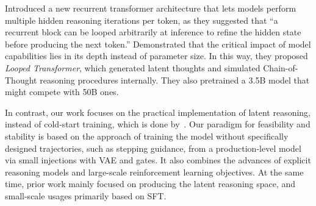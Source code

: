 \citet{geiping2025scalingtesttimecomputelatent} Introduced a new recurrent transformer architecture that lets models perform multiple hidden reasoning iterations per token, as they suggested that ``a recurrent block can be looped arbitrarily at inference to refine the hidden state before producing the next token.''
\citet{saunshi2025reasoninglatentthoughtspower} Demonstrated that the critical impact of model capabilities lies in its depth instead of parameter size.
In this way, they proposed \textit{Looped Transformer}, which generated latent thoughts and simulated Chain-of-Thought reasoning procedures internally.
They also pretrained a 3.5B model that might compete with 50B ones.

In contrast, our work focuses on the practical implementation of latent reasoning, instead of cold-start training, which is done by~\citeauthor{saunshi2025reasoninglatentthoughtspower}.
Our paradigm for feasibility and stability is based on the approach of training the model without specifically designed trajectories, such as stepping guidance, from a production-level model via small injections with VAE and gates.
It also combines the advances of explicit reasoning models and large-scale reinforcement learning objectives.
At the same time, prior work mainly focused on producing the latent reasoning space, and small-scale usages primarily based on SFT\@.
